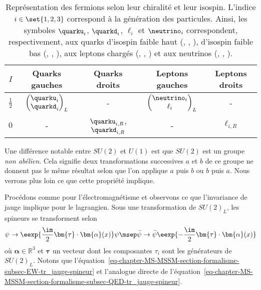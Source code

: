\begin{table}[h]
\centering
\begin{tabular}{ccccc}
\toprule
$I$ & Quarks gauches & Quarks droits & Leptons gauches & Leptons droits\\
\midrule
$\frac{1}{2}$ & $\displaystyle \begin{pmatrix} \quarku_i \\ \quarkd_i \end{pmatrix}_L$ & - & $\displaystyle \begin{pmatrix} \neutrino_i \\ \ell_i \end{pmatrix}_L$ & - \\
$0$ & - & $\quarku_{i,R}$, $\quarkd_{i,R}$ & - & $\ell_{i,R}$\\
\bottomrule
\end{tabular}
\caption{Représentation des fermions selon leur chiralité et leur isospin. L'indice $i\in\set{1,2,3}$ correspond à la génération des particules. Ainsi, les symboles $\quarku_i$, $\quarkd_i$, $\ell_i$ et $\neutrino_i$ correspondent, respectivement, aux quarks d'isospin faible haut (\quarku, \quarkc, \quarkt), d'isospin faible bas (\quarkd, \quarks, \quarkb), aux leptons chargés (\ele, \mu, \tau) et aux neutrinos (\nuele, \numu, \nutau).}
\label{tab-chapter-MS-MSSM-section-formalisme-subsec-EW-rzpt_femrions_chiralite_isospin}
\end{table}
\par Une différence notable entre $SU(2)$ et $U(1)$ est que $SU(2)$ est un groupe \emph{non abélien}. Cela signifie deux transformations successives $a$ et $b$ de ce groupe ne donnent pas le même résultat selon que l'on applique $a$ puis $b$ ou $b$ puis $a$. Nous verrons plus loin ce que cette propriété implique.
\par Procédons comme pour l'électromagnétisme et observons ce que l'invariance de jauge implique pour le lagrangien. Sous une transformation de $SU(2)_L$, les spineurs se transforment selon
\begin{equation}
\psi \to \eexp{\frac{\im}{2}\bm{\tau}\cdot\bm{\alpha}(x)}\psi
\msep
\bar{\psi} \to \bar{\psi}\eexp{-\frac{\im}{2}\bm{\tau}\cdot\bm{\alpha}(x)}
\label{eq-chapter-MS-MSSM-section-formalisme-subsec-EW-tr_jauge-spineur}
\end{equation}
où $\bm{\alpha}\in\mathbb{R}^3$ et $\bm{\tau}$ un vecteur dont les composantes $\tau_i$ sont les générateurs de $SU(2)_L$.
Notons que l'équation~\eqref{eq-chapter-MS-MSSM-section-formalisme-subsec-EW-tr_jauge-spineur} et l'analogue directe de l'équation~\eqref{eq-chapter-MS-MSSM-section-formalisme-subsec-QED-tr_jauge-spineur}.
